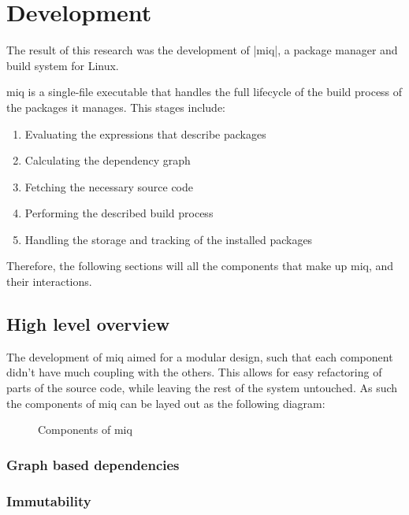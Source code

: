 \chapter{Development}

The result of this research was the development of |miq|, a package manager and
build system for Linux.

miq is a single-file executable that handles the full lifecycle of the build
process of the packages it manages. This stages include:

\begin{enumerate}
    \item Evaluating the expressions that describe packages
    \item Calculating the dependency graph
    \item Fetching the necessary source code
    \item Performing the described build process
    \item Handling the storage and tracking of the installed packages
\end{enumerate}

Therefore, the following sections will all the components that make up miq, and
their interactions.

\section{High level overview}

The development of miq aimed for a modular design, such that
each component didn't have much coupling with the others.
This allows for easy refactoring of parts of the source
code, while leaving the rest of the system untouched. As
such the components of miq can be layed out as the following
diagram:

\begin{figure}
    \centering
    
    \caption{Components of miq}
    \label{fig:miq-components}
\end{figure}

\subsection{Graph based dependencies}

\subsection{Immutability}

